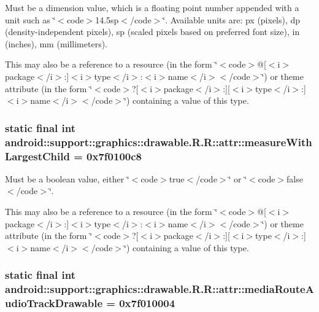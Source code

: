 Must be a dimension value, which is a floating point number appended with a unit such as \char`\"{}$<$code$>$14.5sp$<$/code$>$\char`\"{}. Available units are: px (pixels), dp (density-independent pixels), sp (scaled pixels based on preferred font size), in (inches), mm (millimeters). 

This may also be a reference to a resource (in the form \char`\"{}$<$code$>$@\mbox{[}$<$i$>$package$<$/i$>$:\mbox{]}$<$i$>$type$<$/i$>$:$<$i$>$name$<$/i$>$$<$/code$>$\char`\"{}) or theme attribute (in the form \char`\"{}$<$code$>$?\mbox{[}$<$i$>$package$<$/i$>$:\mbox{]}\mbox{[}$<$i$>$type$<$/i$>$:\mbox{]}$<$i$>$name$<$/i$>$$<$/code$>$\char`\"{}) containing a value of this type. \hypertarget{classandroid_1_1support_1_1graphics_1_1drawable_1_1_r_1_1attr_ef0a0da26c46f26db4d62f0339526a19}{
\subsubsection[{measureWithLargestChild}]{\setlength{\rightskip}{0pt plus 5cm}static final int android::support::graphics::drawable.R.R::attr::measureWithLargestChild = 0x7f0100c8}}
\label{classandroid_1_1support_1_1graphics_1_1drawable_1_1_r_1_1attr_ef0a0da26c46f26db4d62f0339526a19}


Must be a boolean value, either \char`\"{}$<$code$>$true$<$/code$>$\char`\"{} or \char`\"{}$<$code$>$false$<$/code$>$\char`\"{}. 

This may also be a reference to a resource (in the form \char`\"{}$<$code$>$@\mbox{[}$<$i$>$package$<$/i$>$:\mbox{]}$<$i$>$type$<$/i$>$:$<$i$>$name$<$/i$>$$<$/code$>$\char`\"{}) or theme attribute (in the form \char`\"{}$<$code$>$?\mbox{[}$<$i$>$package$<$/i$>$:\mbox{]}\mbox{[}$<$i$>$type$<$/i$>$:\mbox{]}$<$i$>$name$<$/i$>$$<$/code$>$\char`\"{}) containing a value of this type. \hypertarget{classandroid_1_1support_1_1graphics_1_1drawable_1_1_r_1_1attr_5cbc67921f3759566e398fcfa3d32e6e}{
\subsubsection[{mediaRouteAudioTrackDrawable}]{\setlength{\rightskip}{0pt plus 5cm}static final int android::support::graphics::drawable.R.R::attr::mediaRouteAudioTrackDrawable = 0x7f010004}}
\label{classandroid_1_1support_1_1graphics_1_1drawable_1_1_r_1_1attr_5cbc67921f3759566e398fcfa3d32e6e}



